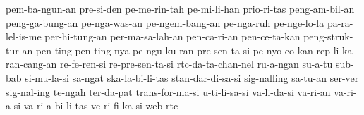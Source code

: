 {    pem-ba-ngun-an pre-si-den pe-me-rin-tah pe-mi-li-han prio-ri-tas peng-am-bil-an
    peng-ga-bung-an pe-nga-was-an pe-ngem-bang-an
    pe-nga-ruh pe-nge-lo-la pa-ra-lel-is-me per-hi-tung-an per-ma-sa-lah-an
    pen-ca-ri-an pen-ce-ta-kan peng-struk-tur-an pen-ting pen-ting-nya pe-ngu-ku-ran
    pre-sen-ta-si pe-nyo-co-kan
    rep-li-ka
    ran-cang-an re-fe-ren-si re-pre-sen-ta-si
    rtc-da-ta-chan-nel
    ru-a-ngan
    su-a-tu
    sub-bab si-mu-la-si sa-ngat ska-la-bi-li-tas
    stan-dar-di-sa-si sig-nalling
    sa-tu-an
    ser-ver
    sig-nal-ing
    te-ngah
    ter-da-pat
    trans-for-ma-si
    u-ti-li-sa-si
    va-li-da-si va-ri-an va-ri-a-si va-ri-a-bi-li-tas ve-ri-fi-ka-si
    web-rtc
}
